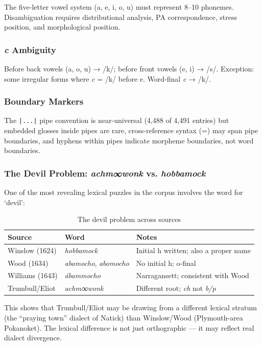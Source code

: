 The five-letter vowel system (a, e, i, o, u) must represent 8--10 phonemes.
Disambiguation requires distributional analysis, PA correspondence, stress
position, and morphological position.

\subsubsection{\textit{c} Ambiguity}

Before back vowels (a, o, u) → /k/; before front vowels (e, i) → /s/.
Exception: some irregular forms where \textit{c} = /k/ before e. Word-final
\textit{c} → /k/.

\subsubsection{Boundary Markers}

The \texttt{|...|} pipe convention is near-universal (4,488 of 4,491 entries)
but embedded glosses inside pipes are rare, cross-reference syntax (=) may
span pipe boundaries, and hyphens within pipes indicate morpheme boundaries,
not word boundaries.

\subsubsection{The Devil Problem: \textit{achm∞wonk} vs. \textit{hobbamock}}

One of the most revealing lexical puzzles in the corpus involves the word for
`devil':

\begin{table}[h]
\centering
\begin{tabular}{lll}
\toprule
Source & Word & Notes \\
\midrule
Winslow (1624) & \textit{hobbamock} & Initial h written; also a proper name \\
Wood (1634) & \textit{abamocho}, \textit{abomocho} & No initial h; o-final \\
Williams (1643) & \textit{ábammocho} & Narragansett; consistent with Wood \\
Trumbull/Eliot & \textit{achm∞wonk} & Different root; \textit{ch} not \textit{b/p} \\
\bottomrule
\end{tabular}
\caption{The devil problem across sources}
\label{tab:1363-devil}
\end{table}

This shows that Trumbull/Eliot may be drawing from a different lexical
stratum (the ``praying town'' dialect of Natick) than Winslow/Wood
(Plymouth-area Pokanoket). The lexical difference is not just orthographic
--- it may reflect real dialect divergence.

